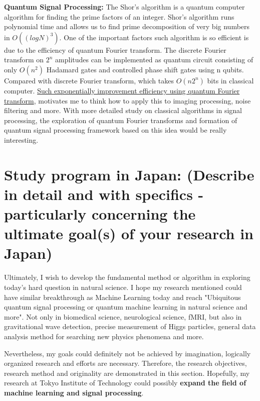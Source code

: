 \documentclass{article}
\begin{document}
\textbf{Quantum Signal Processing:} The Shor's algorithm is a 
quantum computer algorithm for finding the prime factors of an integer. 
Shor's algorithm runs polynomial time and allows us to find prime decomposition of very big 
numbers in $O ((log N)^3)$. One of the important factors such algorithm is so efficient is 
due to the efficiency of quantum Fourier transform. The discrete Fourier transform on 
$2^n$ amplitudes can be implemented as quantum circuit consisting of only $O(n^2)$ Hadamard gates
and controlled phase shift gates using n qubits. Compared with discrete Fourier transform, 
which takes $O(n 2^n )$ bits in classical computer. \underline{Such exponentially improvement 
efficiency using quantum Fourier transform}, motivates me to think how to apply this 
to imaging processing, noise filtering and more. With more detailed study on 
classical algorithms in signal processing, the exploration of quantum 
Fourier transforms and formation of quantum signal processing framework based on 
this idea would be really interesting. 


\section{Study program in Japan:
(Describe in detail and with specifics - particularly
concerning the ultimate goal(s) of your research in Japan)
}

Ultimately, I wish to develop the fundamental method or 
algorithm in exploring today's 
hard question in natural science. I hope my research mentioned 
could have similar breakthrough as Machine Learning today and 
reach "Ubiquitous quantum signal processing or 
quantum machine learning in natural science and more". 
Not only in biomedical science, 
neurological science, fMRI, but also in gravitational 
wave detection, precise measurement of Higgs particles, general 
data analysis method for searching new physics phenomena and more. 

Nevertheless, my goals could definitely not be achieved 
by imagination, logically organized research and efforts are 
necessary. Therefore, the research objectives, research method and
originality are demonstrated in this section. Hopefully,
my research at Tokyo Institute of Technology 
 could possibly \textbf{expand the field of 
machine learning and signal processing}. 
\end{document}
